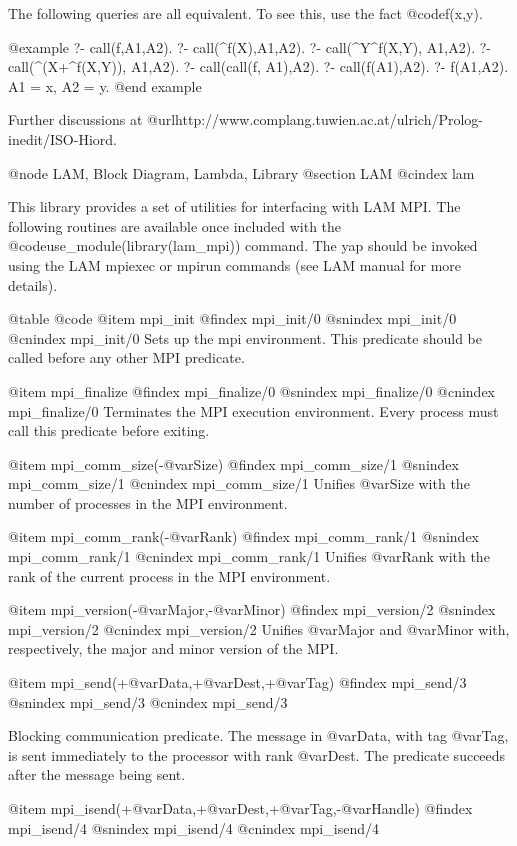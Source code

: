 {{{{{{{{{The following queries are all equivalent. To see this, use
the fact @code{f(x,y)}.

@example
?- call(f,A1,A2).
?- call(\X^f(X),A1,A2).
?- call(\X^Y^f(X,Y), A1,A2).
?- call(\X^(X+\Y^f(X,Y)), A1,A2).
?- call(call(f, A1),A2).
?- call(f(A1),A2).
?- f(A1,A2).
A1 = x,
A2 = y.
@end example

Further discussions
at @url{http://www.complang.tuwien.ac.at/ulrich/Prolog-inedit/ISO-Hiord}.


@node LAM, Block Diagram, Lambda, Library
@section LAM
@cindex lam

This library provides a set of utilities for interfacing with LAM MPI.
The following routines are available once included with the
@code{use_module(library(lam_mpi))} command. The yap should be
invoked using the LAM mpiexec or mpirun commands (see LAM manual for
more details).

@table @code
@item mpi_init
@findex mpi_init/0
@snindex mpi_init/0
@cnindex mpi_init/0
      Sets up the mpi environment. This predicate should be called before any other MPI predicate.

@item mpi_finalize
@findex mpi_finalize/0
@snindex mpi_finalize/0
@cnindex mpi_finalize/0
      Terminates the MPI execution environment. Every process must call this predicate before  exiting.

@item mpi_comm_size(-@var{Size})
@findex mpi_comm_size/1
@snindex mpi_comm_size/1
@cnindex mpi_comm_size/1
      Unifies @var{Size} with the number of processes in the MPI environment.


@item mpi_comm_rank(-@var{Rank})
@findex mpi_comm_rank/1
@snindex mpi_comm_rank/1
@cnindex mpi_comm_rank/1
      Unifies @var{Rank} with the rank of the current process in the MPI environment.

@item mpi_version(-@var{Major},-@var{Minor})
@findex mpi_version/2
@snindex mpi_version/2
@cnindex mpi_version/2
      Unifies @var{Major} and @var{Minor} with, respectively, the major and minor version of the MPI.


@item mpi_send(+@var{Data},+@var{Dest},+@var{Tag})
@findex mpi_send/3
@snindex mpi_send/3
@cnindex mpi_send/3

Blocking communication predicate. The message in @var{Data}, with tag
@var{Tag}, is sent immediately to the processor with rank @var{Dest}.
The predicate succeeds after the message being sent.



@item mpi_isend(+@var{Data},+@var{Dest},+@var{Tag},-@var{Handle})
@findex mpi_isend/4
@snindex mpi_isend/4
@cnindex mpi_isend/4

}}}}}}}}}
